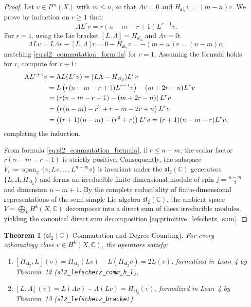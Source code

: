 \documentclass[11pt,a4paper]{article}
\theoremstyle{definition}
\theoremstyle{plain}
\newtheorem{theorem}[definition]{Theorem}
\begin{document}
\begin{proof}
Let $v \in P^m(X)$ with $m \le n$, so that $\Lambda v = 0$ and $H_{\mathfrak{sl}_2} v = (m - n) v$. We prove by induction on $r \ge 1$ that:
\begin{equation}
    \label{eq:sl2_commutation_formula}
    \Lambda L^r v = r(n - m - r + 1) L^{r-1} v.
\end{equation}
For $r = 1$, using the Lie bracket $[L, \Lambda] = H_{\mathfrak{sl}_2}$ and $\Lambda v = 0$:
\begin{equation}
    \Lambda L v = L \Lambda v - [L, \Lambda] v = 0 - H_{\mathfrak{sl}_2} v = -(m - n) v = (n - m) v,
\end{equation}
matching \eqref{eq:sl2_commutation_formula} for $r = 1$. Assuming the formula holds for $r$, compute for $r + 1$:
\begin{align}
    \Lambda L^{r+1} v &= \Lambda L(L^r v) = (L \Lambda - H_{\mathfrak{sl}_2}) L^r v \notag \\
    &= L \left( r(n - m - r + 1) L^{r-1} v \right) - (m + 2r - n) L^r v \notag \\
    &= \left( r(n - m - r + 1) - (m + 2r - n) \right) L^r v \notag \\
    &= \left( r(n - m) - r^2 + r - m - 2r + n \right) L^r v \notag \\
    &= \left( (r + 1)(n - m) - (r^2 + r) \right) L^r v = (r + 1)(n - m - r) L^r v,
\end{align}
completing the induction.

From formula \eqref{eq:sl2_commutation_formula}, if $r \le n - m$, the scalar factor $r(n - m - r + 1)$ is strictly positive. Consequently, the subspace $V_v \coloneqq \operatorname{span}_{\mathbb{C}}\{v, L v, \dots, L^{n-m} v\}$ is invariant under the $\mathfrak{sl}_2(\mathbb{C})$ generators $\{L, \Lambda, H_{\mathfrak{sl}_2}\}$ and forms an irreducible finite-dimensional module of spin $j = \frac{n-m}{2}$ and dimension $n - m + 1$. By the complete reducibility of finite-dimensional representations of the semi-simple Lie algebra $\mathfrak{sl}_2(\mathbb{C})$, the ambient space $V = \bigoplus_k H^k(X, \mathbb{C})$ decomposes into a direct sum of these irreducible modules, yielding the canonical direct sum decomposition \eqref{eq:primitive_lefschetz_sum}.
\end{proof}

\begin{theorem}[$\mathfrak{sl}_2(\mathbb{C})$ Commutation and Degree Counting]
\label{thm:sl2_commutation_identities}
For every cohomology class $v \in H^k(X, \mathbb{C})$, the operators satisfy:
\begin{enumerate}[label=(\roman*)]
    \item $[H_{\mathfrak{sl}_2}, L](v) = H_{\mathfrak{sl}_2}(L v) - L(H_{\mathfrak{sl}_2} v) = 2 L(v)$, formalized in Lean~4 by Theorem~12 (\texttt{sl2\_lefschetz\_comm\_h\_l}).
    \item $[L, \Lambda](v) = L(\Lambda v) - \Lambda(L v) = H_{\mathfrak{sl}_2}(v)$, formalized in Lean~4 by Theorem~13 (\texttt{sl2\_lefschetz\_bracket}).
\end{enumerate}
\end{theorem}
\end{document}
